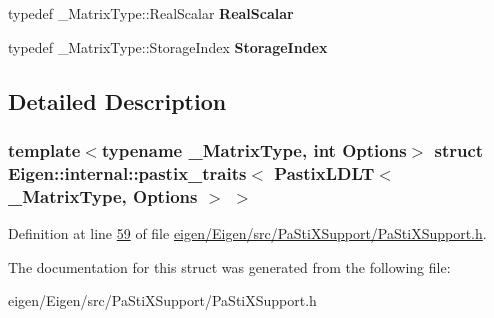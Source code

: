 \begin{DoxyCompactItemize}
\mbox{\label{struct_eigen_1_1internal_1_1pastix__traits_3_01_pastix_l_d_l_t_3_01___matrix_type_00_01_options_01_4_01_4_a3243bad36c09cd5cbab893b71e1ed51c}} 
typedef \+\_\+\+Matrix\+Type\+::\+Real\+Scalar {\bfseries Real\+Scalar}
\item 
\mbox{\label{struct_eigen_1_1internal_1_1pastix__traits_3_01_pastix_l_d_l_t_3_01___matrix_type_00_01_options_01_4_01_4_aa6334f9e5e4c5c1d2a55a51a571766a1}} 
typedef \+\_\+\+Matrix\+Type\+::\+Storage\+Index {\bfseries Storage\+Index}
\end{DoxyCompactItemize}


\subsection{Detailed Description}
\subsubsection*{template$<$typename \+\_\+\+Matrix\+Type, int Options$>$\newline
struct Eigen\+::internal\+::pastix\+\_\+traits$<$ Pastix\+L\+D\+L\+T$<$ \+\_\+\+Matrix\+Type, Options $>$ $>$}



Definition at line \hyperlink{eigen_2_eigen_2src_2_pa_sti_x_support_2_pa_sti_x_support_8h_source_l00059}{59} of file \hyperlink{eigen_2_eigen_2src_2_pa_sti_x_support_2_pa_sti_x_support_8h_source}{eigen/\+Eigen/src/\+Pa\+Sti\+X\+Support/\+Pa\+Sti\+X\+Support.\+h}.



The documentation for this struct was generated from the following file\+:\begin{DoxyCompactItemize}
\item 
eigen/\+Eigen/src/\+Pa\+Sti\+X\+Support/\+Pa\+Sti\+X\+Support.\+h\end{DoxyCompactItemize}
